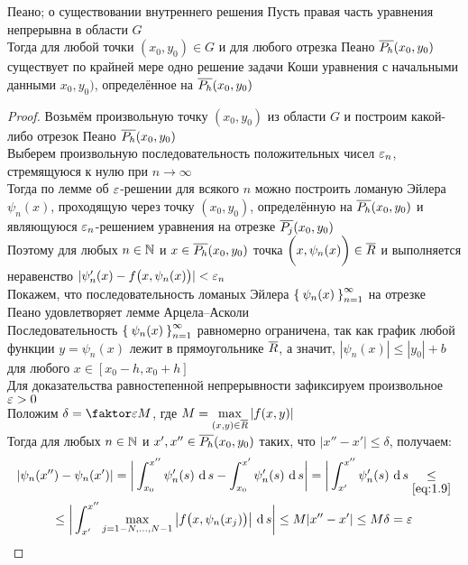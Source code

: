 \begin{theorem}{Пеано; о существовании внутреннего решения}
    Пусть правая часть уравнения  непрерывна в области $ G $ \\
    Тогда для любой точки $ (x_0, y_0) \in G $ и для любого отрезка Пеано $ \overline{P_h}(x_0, y_0) $ существует по крайней мере одно решение задачи Коши уравнения  с начальными данными $ x_0, y_0) $, определённое на $ \overline{P_h}(x_0, y_0) $
\end{theorem}

\begin{proof}
    Возьмём произвольную точку $ (x_0, y_0) $ из области $ G $ и построим какой-либо отрезок Пеано $ \overline{P_h}(x_0, y_0) $ \\
    Выберем произвольную последовательность положительных чисел $ \varepsilon_n $, стремящуюся к нулю при $ n \to \infty $ \\
    Тогда по лемме об $ \varepsilon $-решении для всякого $ n $ можно построить ломаную Эйлера $ \psi_n(x) $, проходящую через точку $ (x_0, y_0) $, определённую на $ \overline{P_h}(x_0, y_0) $ и являющуюся $ \varepsilon_n $-решением уравнения  на отрезке $ \overline{P_j}(x_0, y_0) $ \\
    Поэтому для любых $ n \in \mathbb{N} $ и $ x \in \overline{P_h}(x_0, y_0) $ точка $ \bigg( x, \psi_n(x) \bigg) \in \overline{R} $ и выполняется неравенство  $ |\psi_n'(x) - f \big( x, \psi_n(x) \big) | < \varepsilon_n $ \\
    Покажем, что последовательность ломаных Эйлера $ \Set{\psi_n(x)}_{n=1}^{\infty} $ на отрезке Пеано удовлетворяет лемме Арцела--Асколи \\
    Последовательность $ \Set{\psi_n(x)}_{n=1}^{\infty} $ равномерно ограничена, так как график любой функции $ y = \psi_n(x) $ лежит в прямоугольнике $ \overline{R} $, а значит, $ |\psi_n(x)| \le |y_0| + b $ для любого $ x \in [x_0 - h, x_0 + h] $ \\
    Для доказательства равностепенной непрерывности зафиксируем произвольное $ \varepsilon > 0 $ \\
    Положим $ \delta = \faktor\veps{M} $, где $ M = \max\limits_{(x, y) \in \overline{R}}|f(x, y)| $ \\
    Тогда для любых $ n \in \mathbb{N} $ и $ x', x'' \in \overline{P_h}(x_0, y_0) $ таких, что $ |x'' - x'| \le \delta $, получаем:
    \begin{multline*}
        |\psi_n(x'') - \psi_n(x')| = \bigg| \dint[s]{x_0}{x''}{\psi_n'(s)} - \dint[s]{x_0}{x'}{\psi_n'(s)} \bigg| = \bigg| \dint[s]{x'}{x''}{\psi_n'(s)} \underset{\eref{1.9}}\le \\
        \le \bigg| \dint[s]{x'}{x''}{\max\limits_{j = 1 - N, ..., N - 1} \big| f \big( x, \psi_n(x_j) \big) \big|} \bigg| \le M|x'' - x'| \le M\delta = \veps

\end{multline*}
\end{proof}
